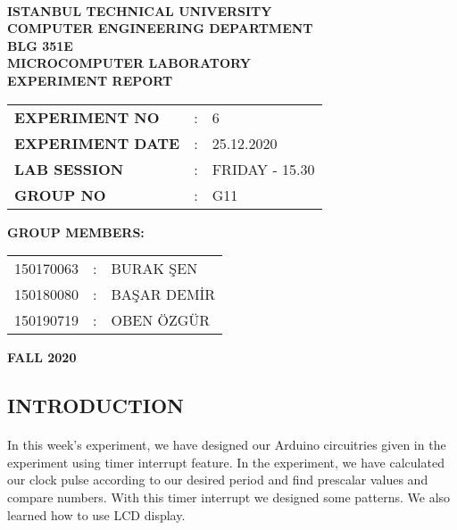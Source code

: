 \documentclass[pdftex,12pt,a4paper]{article}
\begin{document}
\begin{titlepage}
\begin{center}
\textbf{}\\
\textbf{\Large{ISTANBUL TECHNICAL UNIVERSITY}}\\
\vspace{0.5cm}
\textbf{\Large{COMPUTER ENGINEERING DEPARTMENT}}\\
\vspace{2cm}
\textbf{\Large{BLG 351E\\ MICROCOMPUTER LABORATORY\\ EXPERIMENT REPORT}}\\
\vspace{2.8cm}
\begin{table}[ht]
\centering
\Large{
\begin{tabular}{lcl}
\textbf{EXPERIMENT NO}  & : & 6 \\
\textbf{EXPERIMENT DATE}  & : & 25.12.2020 \\
\textbf{LAB SESSION}  & : & FRIDAY - 15.30 \\
\textbf{GROUP NO}  & : & G11 \\
\end{tabular}}
\end{table}
\vspace{1cm}
\textbf{\Large{GROUP MEMBERS:}}\\
\begin{table}[ht]
\centering
\Large{
\begin{tabular}{rcl}
150170063 & : & BURAK ŞEN \\
150180080  & : & BAŞAR DEMİR \\
150190719  & : &  OBEN ÖZGÜR \\
\end{tabular}}
\end{table}
\vspace{2.8cm}
\textbf{\Large{FALL 2020}}

\end{center}

\end{titlepage}

\thispagestyle{empty}
\setcounter{tocdepth}{4}
\tableofcontents
\clearpage
\setcounter{page}{1}
\newpage
\begin{flushleft}
\section{INTRODUCTION}
\paragraph{}
In this week's experiment, we have designed our Arduino circuitries given in the experiment using timer interrupt feature. In the experiment, we have calculated our clock pulse according to our desired period and find prescalar values and compare numbers. With this timer interrupt we designed some patterns. We also learned how to use LCD display. 


\end{flushleft} 
\end{document}
